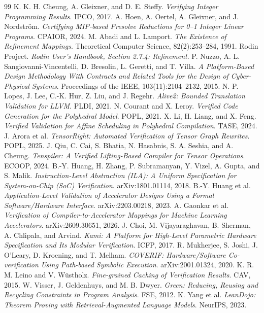 \documentclass[11pt]{article}
\begin{document}
\begin{thebibliography}{99}
 K. K. H. Cheung, A. Gleixner, and D. E. Steffy. \emph{Verifying Integer Programming Results}. IPCO, 2017.
 A. Hoen, A. Oertel, A. Gleixner, and J. Nordström. \emph{Certifying MIP-based Presolve Reductions for 0--1 Integer Linear Programs}. CPAIOR, 2024.
 M. Abadi and L. Lamport. \emph{The Existence of Refinement Mappings}. Theoretical Computer Science, 82(2):253--284, 1991.
 Rodin Project. \emph{Rodin User's Handbook, Section 2.7.4: Refinement}.
 P. Nuzzo, A. L. Sangiovanni-Vincentelli, D. Bresolin, L. Geretti, and T. Villa. \emph{A Platform-Based Design Methodology With Contracts and Related Tools for the Design of Cyber-Physical Systems}. Proceedings of the IEEE, 103(11):2104--2132, 2015.
 N. P. Lopes, J. Lee, C.-K. Hur, Z. Liu, and J. Regehr. \emph{Alive2: Bounded Translation Validation for LLVM}. PLDI, 2021.
 N. Courant and X. Leroy. \emph{Verified Code Generation for the Polyhedral Model}. POPL, 2021.
 X. Li, H. Liang, and X. Feng. \emph{Verified Validation for Affine Scheduling in Polyhedral Compilation}. TASE, 2024.
 J. Arora et al. \emph{TensorRight: Automated Verification of Tensor Graph Rewrites}. POPL, 2025.
 J. Qiu, C. Cai, S. Bhatia, N. Hasabnis, S. A. Seshia, and A. Cheung. \emph{Tenspiler: A Verified Lifting-Based Compiler for Tensor Operations}. ECOOP, 2024.
 B.-Y. Huang, H. Zhang, P. Subramanyan, Y. Vizel, A. Gupta, and S. Malik. \emph{Instruction-Level Abstraction (ILA): A Uniform Specification for System-on-Chip (SoC) Verification}. arXiv:1801.01114, 2018.
 B.-Y. Huang et al. \emph{Application-Level Validation of Accelerator Designs Using a Formal Software/Hardware Interface}. arXiv:2203.00218, 2023.
 A. Gaonkar et al. \emph{Verification of Compiler-to-Accelerator Mappings for Machine Learning Accelerators}. arXiv:2609.30651, 2026.
 J. Choi, M. Vijayaraghavan, B. Sherman, A. Chlipala, and Arvind. \emph{Kami: A Platform for High-Level Parametric Hardware Specification and Its Modular Verification}. ICFP, 2017.
 R. Mukherjee, S. Joshi, J. O'Leary, D. Kroening, and T. Melham. \emph{COVERIF: Hardware/Software Co-verification Using Path-based Symbolic Execution}. arXiv:2001.01324, 2020.
 K. R. M. Leino and V. Wüstholz. \emph{Fine-grained Caching of Verification Results}. CAV, 2015.
 W. Visser, J. Geldenhuys, and M. B. Dwyer. \emph{Green: Reducing, Reusing and Recycling Constraints in Program Analysis}. FSE, 2012.
 K. Yang et al. \emph{LeanDojo: Theorem Proving with Retrieval-Augmented Language Models}. NeurIPS, 2023.

\end{thebibliography}
\end{document}
